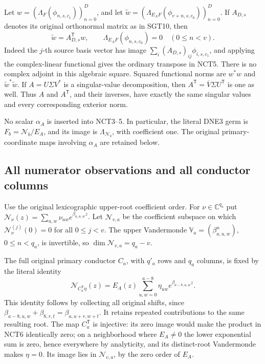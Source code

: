 \documentclass[11pt,a4paper]{article}
\begin{document}
Let \(w=(\Lambda_F(\phi_{n,s,c_1}))_{n=0}^D\), and let
\(\widetilde w=(\Lambda_{E_AF}(\phi_{v+n,s,c_0}))_{n=0}^D\).
If \(A_{D,s}\) denotes its original orthonormal matrix as in SGT10,
then
\[
 \widetilde w=A_{D,s}^{\mathsf T}w,
 \qquad
 \Lambda_{E_AF}(\phi_{n,s,c_0})=0\quad(0\le n<v).
 \tag{NCT5}
\]
Indeed the \(j\)-th source basis vector has image
\(\sum_i(A_{D,s})_{ij}\phi_{i,s,c_1}\), and applying the
complex-linear functional gives the ordinary transpose in NCT5.
There is no complex adjoint in this algebraic square.  Squared
functional norms are \(w^*w\) and \(\widetilde w^*\widetilde w\).
If \(A=U\Sigma V^*\) is a singular-value decomposition, then
\(A^{\mathsf T}=\overline V\Sigma U^{\mathsf T}\) is one as well.
Thus \(A\) and \(A^{\mathsf T}\), and their inverses, have exactly
the same singular values and every corresponding exterior norm.

No scalar \(\alpha_A\) is inserted into NCT3--5.  In particular,
the literal DNE3 germ is \(F_b=\mathcal N_b/E_A\), and its image
is \(\Lambda_{\mathcal N_b}\), with coefficient one.  The original
primary-coordinate maps involving \(\alpha_A\) are retained below.

\subsection{All numerator observations and all conductor columns}

Use the original lexicographic upper-root coefficient order.  For
\(\nu\in\mathbb C^{q_a}\) put
\(\mathcal N_\nu(z)=\sum_{u,w}\nu_{uw}e^{\beta_{a,u,w}z}\).
Let \(\mathscr N_{v,a}\) be the coefficient subspace on which
\(\mathcal N_\nu^{(j)}(0)=0\) for all \(0\le j<v\).
The upper Vandermonde \(\mathbb V_a=(\beta_{a,u,w}^{n})\),
\(0\le n<q_a\), is invertible, so
\(\dim\mathscr N_{v,a}=q_a-v\).

The full original primary conductor \(C_a\), with \(q'_a\) rows
and \(q_a\) columns, is fixed by the literal identity
\[
 \mathcal N_{C_a^{\mathsf T}\eta}(z)
       =E_A(z)\sum_{u,w=0}^{a-8}\eta_{uw}
                         e^{\beta_{a-8,u,w}z}.
 \tag{NCT6}
\]
This identity follows by collecting all original shifts, since
\(\beta_{a-8,u,w}+\beta_{8,r,t}=\beta_{a,u+r,w+t}\).
It retains repeated contributions to the same resulting root.
The map \(C_a^{\mathsf T}\) is injective: its zero image would make
the product in NCT6 identically zero; on a neighborhood where
\(E_A\ne0\) the lower exponential sum is zero, hence everywhere
by analyticity, and its distinct-root Vandermonde makes \(\eta=0\).
Its image lies in \(\mathscr N_{v,a}\), by the zero order of \(E_A\).
\end{document}
